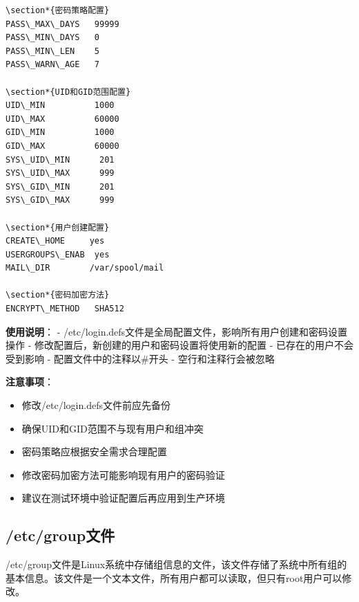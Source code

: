 \documentclass[12pt,UTF8]{ctexbook}
\begin{document}
\begin{verbatim}
\section*{密码策略配置}
PASS\_MAX\_DAYS   99999
PASS\_MIN\_DAYS   0
PASS\_MIN\_LEN    5
PASS\_WARN\_AGE   7

\section*{UID和GID范围配置}
UID\_MIN          1000
UID\_MAX          60000
GID\_MIN          1000
GID\_MAX          60000
SYS\_UID\_MIN      201
SYS\_UID\_MAX      999
SYS\_GID\_MIN      201
SYS\_GID\_MAX      999

\section*{用户创建配置}
CREATE\_HOME     yes
USERGROUPS\_ENAB  yes
MAIL\_DIR        /var/spool/mail

\section*{密码加密方法}
ENCRYPT\_METHOD   SHA512
\end{verbatim}

\textbf{使用说明}：
- /etc/login.defs文件是全局配置文件，影响所有用户创建和密码设置操作
- 修改配置后，新创建的用户和密码设置将使用新的配置
- 已存在的用户不会受到影响
- 配置文件中的注释以\#开头
- 空行和注释行会被忽略

\textbf{注意事项}：
\begin{itemize}
    \item 修改/etc/login.defs文件前应先备份
    \item 确保UID和GID范围不与现有用户和组冲突
    \item 密码策略应根据安全需求合理配置
    \item 修改密码加密方法可能影响现有用户的密码验证
    \item 建议在测试环境中验证配置后再应用到生产环境
\end{itemize}

\subsection{/etc/group文件}

/etc/group文件是Linux系统中存储组信息的文件，该文件存储了系统中所有组的基本信息。该文件是一个文本文件，所有用户都可以读取，但只有root用户可以修改。
\end{document}
